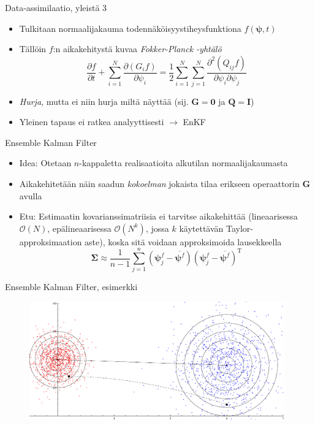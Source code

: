 \documentclass{beamer}
\begin{document}
\begin{frame}{Data-assimilaatio, yleistä 3}

\begin{itemize}
\item Tulkitaan normaalijakauma todennäköisyystiheysfunktiona $f(\boldsymbol{\psi},t)$
\item Tällöin $f$:n aikakehitystä kuvaa \emph{Fokker-Planck -yhtälö}
\[
\frac{\partial f}{\partial t} + \sum_{i=1}^N \frac{\partial \left ( G_i f \right )}{\partial \psi_i} = \frac{1}{2} \sum_{i=1}^N \sum_{j=1}^N \frac{\partial^2 \left ( Q_{ij} f \right )}{\partial \psi_i \partial \psi_j}
\]
\item \emph{Hurja}, mutta ei niin hurja miltä näyttää (sij. $\mathbf{G} = \mathbf{0}$ ja $\mathbf{Q} = \mathbf{I}$) 
\item Yleinen tapaus ei ratkea analyyttisesti $\rightarrow$ EnKF
\end{itemize}

\end{frame}

\begin{frame}{Ensemble Kalman Filter}

\begin{itemize}
\item Idea: Otetaan $n$-kappaletta realisaatioita alkutilan normaalijakaumasta
\item Aikakehitetään näin saadun \emph{kokoelman} jokaista tilaa erikseen operaattorin $\boldsymbol{G}$ avulla
\item Etu: Estimaatin kovarianssimatriisia ei tarvitse aikakehittää (lineaarisessa $\mathcal{O}(N)$, epälineaarisessa $\mathcal{O}(N^k)$, jossa $k$ käytettävän Taylor-approksimaation aste), koska sitä voidaan approksimoida lausekkeella
\[
\boldsymbol{\Sigma} \approx \frac{1}{n-1} \sum_{j=1}^n \left( \boldsymbol{\psi}^f_j - \overline{\boldsymbol{\psi}^f} \right) \left(\boldsymbol{\psi}^f_j - \overline{\boldsymbol{\psi}^f}  \right)^\mathrm{T}
\]
\end{itemize}

\end{frame}

\begin{frame}{Ensemble Kalman Filter, esimerkki}

\begin{figure}
\includegraphics[width=11cm]{enkf3.pdf}
\end{figure}

\end{frame}
\end{document}
